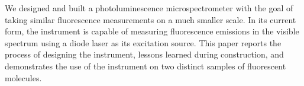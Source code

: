 We designed and built a photoluminescence microspectrometer with the goal of taking similar fluorescence measurements on a much smaller scale. In its current form, the instrument is capable of measuring fluorescence emissions in the visible spectrum using a diode laser as its excitation source. This paper reports the process of designing the instrument, lessons learned during construction, and demonstrates the use of the instrument on two distinct samples of fluorescent molecules.
